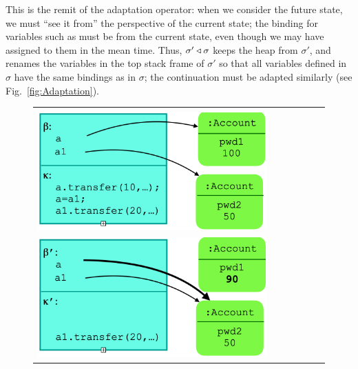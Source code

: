 This is the remit of the adaptation operator: when we consider the
future state, we must ``see it from'' the perspective of the current
state; the binding for variables such as  must be from the
current state, even though we may have assigned to them in the mean
time.  Thus, $\sigma' \triangleleft \sigma$ keeps the heap from $\sigma'$,
and renames the variables
in the top stack frame of  $\sigma'$ so that all variables defined in $\sigma$ have the same 
bindings
as in   $\sigma$; the continuation must be adapted similarly (see
Fig.~\ref{fig:Adaptation}).
%
%
\begin{figure}[htbp]
\begin{tabular}{clclc}
 \begin{minipage}{0.27\textwidth}
 $\sigma:$\\
 \includegraphics[width=\linewidth]{diagrams/adapt1.png}
   \end{minipage}
 & \ \ \ &
 \begin{minipage}{0.27\textwidth}
  $\sigma':$\\
  \includegraphics[width=\linewidth]{diagrams/adapt2.png}
   \end{minipage}

\end{tabular}
\end{figure}
